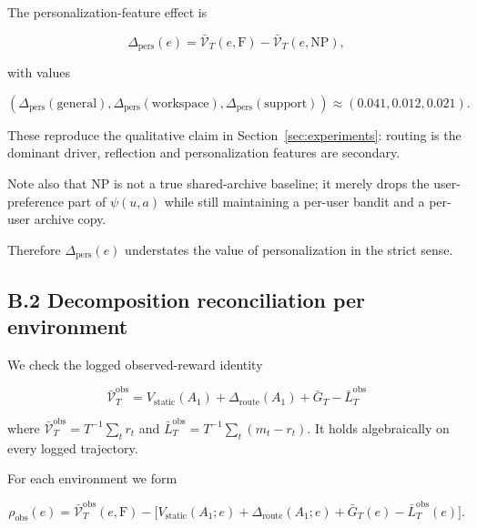 \documentclass{article} %
\begin{document}
The personalization-feature effect is

\begin{equation}
\label{eq:app-pers-effect}
\Delta_{\mathrm{pers}}(e) = \bar{\mathcal{V}}_T(e,\mathrm{F}) - \bar{\mathcal{V}}_T(e,\mathrm{NP}),
\end{equation}

with values

\begin{equation}
\label{eq:app-pers-numbers}
(\Delta_{\mathrm{pers}}(\mathrm{general}),\Delta_{\mathrm{pers}}(\mathrm{workspace}),\Delta_{\mathrm{pers}}(\mathrm{support}))
\approx (0.041, 0.012, 0.021).
\end{equation}

These reproduce the qualitative claim in Section~\ref{sec:experiments}: routing is the dominant driver, reflection and personalization features are secondary.

Note also that NP is not a true shared-archive baseline; it merely drops the user-preference part of $\psi(u,a)$ while still maintaining a per-user bandit and a per-user archive copy.

Therefore $\Delta_{\mathrm{pers}}(e)$ understates the value of personalization in the strict sense.

\subsection{B.2 Decomposition reconciliation per environment}

\label{app:decomp-reconcile}

We check the logged observed-reward identity

\begin{equation}
\label{eq:app-identity-recall}
\bar{\mathcal{V}}_T^{\mathrm{obs}}
= V_{\mathrm{static}}(A_1)
+ \Delta_{\mathrm{route}}(A_1)
+ \bar{G}_T
- \bar{L}_T^{\mathrm{obs}}
\end{equation}

where
\(\bar{\mathcal V}_T^{\mathrm{obs}}=T^{-1}\sum_t r_t\) and
\(\bar L_T^{\mathrm{obs}}=T^{-1}\sum_t(m_t-r_t)\). It holds algebraically on
every logged trajectory.

For each environment we form

\begin{equation}
\label{eq:app-residual}
\rho_{\mathrm{obs}}(e)
= \bar{\mathcal{V}}_T^{\mathrm{obs}}(e,\mathrm{F})
- \big[V_{\mathrm{static}}(A_1;e)
+ \Delta_{\mathrm{route}}(A_1;e)
+ \bar{G}_T(e)
- \bar{L}_T^{\mathrm{obs}}(e)\big].
\end{equation}
\end{document}
